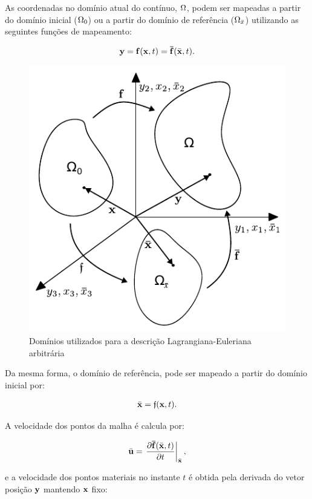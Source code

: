 \documentclass[tese_patricia]{subfiles}%
\begin{document}
As coordenadas no domínio atual do contínuo, $\Omega$, podem ser mapeadas a partir do domínio inicial ($\Omega_{0}$) ou a partir do domínio de referência ($\Omega_{\bar{x}}$) utilizando as seguintes funções de mapeamento:  

\begin{align}
	\mathbf{y} = \mathbf{f}(\mathbf{x},t) = \mathbf{\bar{f}}(\bar{\mathbf{x}},t).
\end{align}

\begin{figure}[htb!]
	\centering
	\includegraphics[scale=1.0]{Imagens/Cap2/dominioALE.pdf}	
	\caption{Domínios utilizados para a descrição Lagrangiana-Euleriana arbitrária}
	\label{fig:dominioAle}
\end{figure}

Da mesma forma, o domínio de referência, pode ser mapeado a partir do domínio inicial por:

\begin{align}
	\bar{\mathbf{x}} = \mathfrak{f}(\mathbf{x},t).
\end{align}

A velocidade dos pontos da malha é calcula por:

\begin{align}
	\bar{\mathbf{u}} = \left. \frac{\partial \mathbf{\bar{f}}(\bar{\mathbf{x}},t)}{\partial t} \right|_{\bar{\mathbf{x}}},
\end{align}

\noindent e a velocidade dos pontos materiais no instante $t$ é obtida pela derivada do vetor posição $\mathbf{y}$ mantendo $\mathbf{x}$ fixo:
\end{document}
